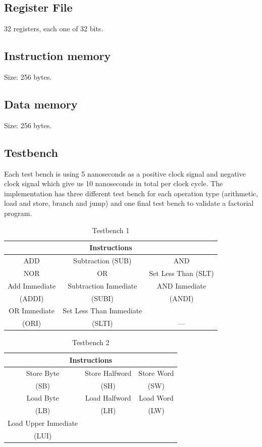 \documentclass[conference]{IEEEtran}
\begin{document}
\subsection{Register File}
32 registers, each one of 32 bits.
\subsection{Instruction memory}
Size: 256 bytes.
\subsection{Data memory}
Size: 256 bytes.
\subsection{Testbench}
Each test bench is using 5 nanoseconds as a positive clock signal and negative clock signal which give us 10 nanoseconds in total per clock cycle. The implementation has three different test bench for each operation type (arithmetic, load and store, branch and jump) and one final test bench to validate a factorial program.

\FloatBarrier
\begin{table}[htbp]
	\caption{Testbench 1} %
	\begin{tabular}{|c|c|c|}
		\hline
		\multicolumn{3}{|c|}{\textbf{Instructions}} \\
		\hline
		ADD&Subtraction (SUB)&AND  \\
		\hline
		NOR&OR&Set Less Than (SLT) \\
		\hline
		Add Immediate&Subtraction Inmediate & AND Inmediate \\
		(ADDI) &(SUBI) & (ANDI) \\
		\hline
		OR Immediate&Set Less Than Immediate&  \\
		(ORI)&(SLTI)& --- \\
		\hline
	\end{tabular}
	\label{tab_test1}
\end{table}
\FloatBarrier

\FloatBarrier
\begin{table}[t]
	\caption{Testbench 2} %
	\begin{center}
		\begin{tabular}{|c|c|c|}
			\hline
			\multicolumn{3}{|c|}{\textbf{Instructions}} \\
			\hline
			Store Byte&Store Halfword&Store Word\\
			(SB)&(SH)&(SW)  \\
			\hline
			Load Byte&Load Halfword&Load Word\\
			(LB)&(LH)&(LW) \\
			\hline
			Load Upper Inmediate&&\\
			(LUI)&& \\
			\hline
		\end{tabular}
		\label{tab_test2}
	\end{center}
\end{table}
\FloatBarrier
\end{document}
